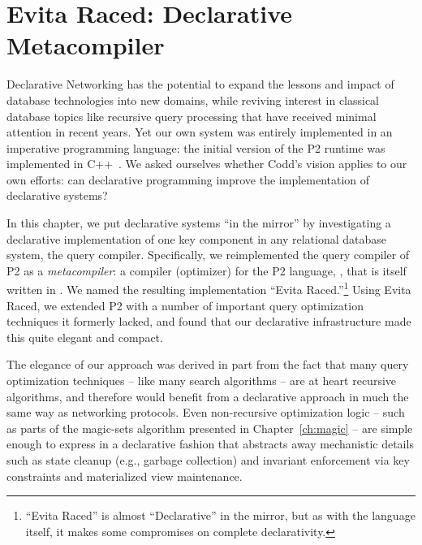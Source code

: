 \chapter[Evita Raced: Declarative Metacompiler]{Evita Raced: Declarative Metacompiler}
\label{ch:evita}

Declarative Networking has the potential to expand the lessons and impact of
database technologies into new domains, while reviving interest in classical
database topics like recursive query processing that have received minimal
attention in recent years.  Yet our own system was entirely implemented in an
imperative programming language: the initial version of the P2 runtime was
implemented in C++~\cite{p2:sosp}.  We asked ourselves whether Codd's vision
applies to our own efforts: can declarative programming improve the
implementation of declarative systems?

In this chapter, we put declarative systems ``in the mirror'' by investigating
a declarative implementation of one key component in any relational database
system, the query compiler.  Specifically, we reimplemented the query
compiler of P2 as a {\em metacompiler}: a compiler (optimizer) for the P2
language, \OVERLOG, that is itself written in \OVERLOG.  We named the resulting
implementation ``Evita Raced.''\footnote{``Evita Raced'' is almost
``Declarative'' in the mirror, but as with the \OVERLOG language itself, it
makes some compromises on complete declarativity.} Using Evita Raced, we
extended P2 with a number of important query optimization techniques it
formerly lacked, and found that our declarative infrastructure made this quite
elegant and compact.  

The elegance of our approach was derived in part from the fact that many query
optimization techniques -- like many search algorithms -- are at heart
recursive algorithms, and therefore would benefit from a declarative approach
in much the same way as networking protocols.  Even non-recursive optimization
logic -- such as parts of the magic-sets algorithm presented in
Chapter~\ref{ch:magic} -- are simple enough to express in a declarative fashion
that abstracts away mechanistic details such as state cleanup (e.g., garbage
collection) and invariant enforcement via key constraints and materialized view
maintenance.

